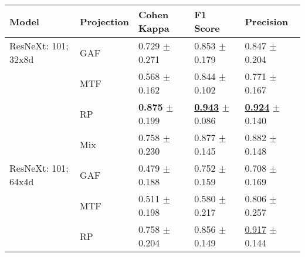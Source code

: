 
\begin{tabular}[t]{lllll}
\toprule
Model & Projection & Cohen Kappa & F1 Score & Precision \\
\midrule
ResNeXt: 101; 32x8d & GAF & \textcolor[rgb]{0.3684210526,0.5000000000,0}{0.729} $\pm$ \textcolor[rgb]{0.9191588087,0.0808411913,0}{0.271} & \textcolor[rgb]{0.2474452555,0.5000000000,0}{0.853} $\pm$ \textcolor[rgb]{0.7128921737,0.2871078263,0}{0.179} & \textcolor[rgb]{0.3548387097,0.5000000000,0}{0.847} $\pm$ \textcolor[rgb]{0.5730017598,0.4269982402,0}{0.204} \\
 & MTF & \textcolor[rgb]{0.7751196172,0.2248803828,0}{0.568} $\pm$ \textcolor[rgb]{0.1258520059,0.5000000000,0}{0.162} & \textcolor[rgb]{0.2715328467,0.5000000000,0}{0.844} $\pm$ \textcolor[rgb]{0.1268636042,0.5000000000,0}{0.102} & \textcolor[rgb]{0.7096774194,0.2903225806,0}{0.771} $\pm$ \textcolor[rgb]{0.2805288473,0.5000000000,0}{0.167} \\
 & RP & \textbf{\textcolor[rgb]{0.0000000000,0.5000000000,0}{0.875}} $\pm$ \textcolor[rgb]{0.4000962485,0.5000000000,0}{0.199} & \underline{\textbf{\textcolor[rgb]{0.0000000000,0.5000000000,0}{0.943}}} $\pm$ \textcolor[rgb]{0.0055956460,0.5000000000,0}{0.086} & \underline{\textbf{\textcolor[rgb]{0.0000000000,0.5000000000,0}{0.924}}} $\pm$ \textcolor[rgb]{0.0605254734,0.5000000000,0}{0.140} \\
 & Mix & \textcolor[rgb]{0.2947368421,0.5000000000,0}{0.758} $\pm$ \textcolor[rgb]{0.6253424922,0.3746575078,0}{0.230} & \textcolor[rgb]{0.1806569343,0.5000000000,0}{0.877} $\pm$ \textcolor[rgb]{0.4522873410,0.5000000000,0}{0.145} & \textcolor[rgb]{0.1935483871,0.5000000000,0}{0.882} $\pm$ \textcolor[rgb]{0.1308023356,0.5000000000,0}{0.148} \\
ResNeXt: 101; 64x4d & GAF & \textcolor[rgb]{1.0000000000,0.0000000000,0}{0.479} $\pm$ \textcolor[rgb]{0.3203113470,0.5000000000,0}{0.188} & \textcolor[rgb]{0.5277372263,0.4722627737,0}{0.752} $\pm$ \textcolor[rgb]{0.5565692495,0.4434307505,0}{0.159} & \textcolor[rgb]{1.0000000000,0.0000000000,0}{0.708} $\pm$ \textcolor[rgb]{0.2918407482,0.5000000000,0}{0.169} \\
 & MTF & \textcolor[rgb]{0.9192982456,0.0807017544,0}{0.511} $\pm$ \textcolor[rgb]{0.3897912467,0.5000000000,0}{0.198} & \textcolor[rgb]{1.0000000000,0.0000000000,0}{0.580} $\pm$ \textcolor[rgb]{1.0000000000,0.0000000000,0}{0.217} & \textcolor[rgb]{0.5483870968,0.4516129032,0}{0.806} $\pm$ \textcolor[rgb]{1.0000000000,0.0000000000,0}{0.257} \\
 & RP & \textcolor[rgb]{0.2947368421,0.5000000000,0}{0.758} $\pm$ \textcolor[rgb]{0.4355254635,0.5000000000,0}{0.204} & \textcolor[rgb]{0.2400796284,0.5000000000,0}{0.856} $\pm$ \textcolor[rgb]{0.4833694125,0.5000000000,0}{0.149} & \underline{\textcolor[rgb]{0.0322580645,0.5000000000,0}{0.917}} $\pm$ \textcolor[rgb]{0.0976605228,0.5000000000,0}{0.144} \\

\end{tabular}
